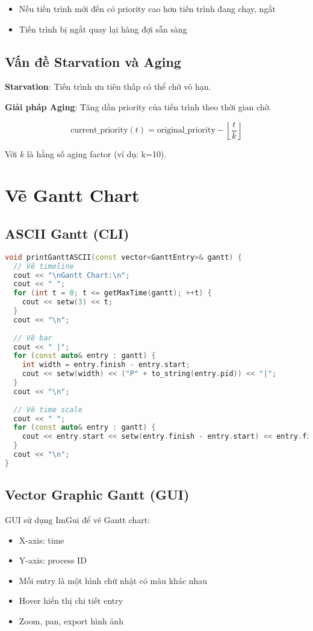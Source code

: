 \begin{itemize}[leftmargin=1.5cm]
  \item Nếu tiến trình mới đến có priority cao hơn tiến trình đang chạy, ngắt
  \item Tiến trình bị ngắt quay lại hàng đợi sẵn sàng
\end{itemize}

\subsection{Vấn đề Starvation và Aging}

\textbf{Starvation}: Tiến trình ưu tiên thấp có thể chờ vô hạn.

\textbf{Giải pháp Aging}: Tăng dần priority của tiến trình theo thời gian chờ.

\begin{equation}
\text{current\_priority}(t) = \text{original\_priority} - \left\lfloor \frac{t}{k} \right\rfloor
\end{equation}

Với $k$ là hằng số aging factor (ví dụ: k=10).

\section{Vẽ Gantt Chart}

\subsection{ASCII Gantt (CLI)}

\begin{lstlisting}[language=C++,caption={Vẽ Gantt ASCII}]
void printGanttASCII(const vector<GanttEntry>& gantt) {
  // Vẽ timeline
  cout << "\nGantt Chart:\n";
  cout << " ";
  for (int t = 0; t <= getMaxTime(gantt); ++t) {
    cout << setw(3) << t;
  }
  cout << "\n";
  
  // Vẽ bar
  cout << " |";
  for (const auto& entry : gantt) {
    int width = entry.finish - entry.start;
    cout << setw(width) << ("P" + to_string(entry.pid)) << "|";
  }
  cout << "\n";
  
  // Vẽ time scale
  cout << " ";
  for (const auto& entry : gantt) {
    cout << entry.start << setw(entry.finish - entry.start) << entry.finish;
  }
  cout << "\n";
}
\end{lstlisting}

\subsection{Vector Graphic Gantt (GUI)}

GUI sử dụng ImGui để vẽ Gantt chart:
\begin{itemize}[leftmargin=1.5cm]
  \item X-axis: time
  \item Y-axis: process ID
  \item Mỗi entry là một hình chữ nhật có màu khác nhau
  \item Hover hiển thị chi tiết entry
  \item Zoom, pan, export hình ảnh
\end{itemize}

\clearpage
